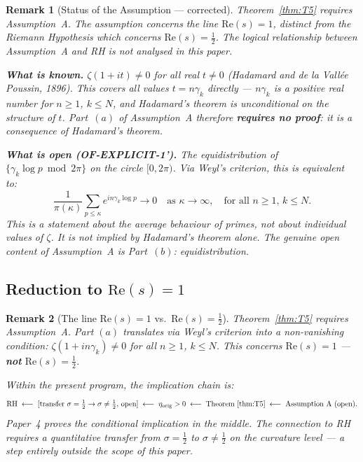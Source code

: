 \documentclass[11pt]{article}
\newtheorem*{remark}{Remark}
\newcommand{\etaorig}{\eta_{\mathrm{orig}}}
\begin{document}
\begin{remark}[Status of the Assumption --- corrected]\label{rem:assumption-status}
Theorem~\ref{thm:T5} requires Assumption~A.
The assumption concerns the line $\mathrm{Re}(s)=1$, distinct from the Riemann
Hypothesis which concerns $\mathrm{Re}(s)=\tfrac{1}{2}$.
The logical relationship between Assumption~A and RH is not analysed in this paper.

\textbf{What is known.}
$\zeta(1+it)\neq 0$ for all real $t\neq 0$
(Hadamard and de la Vall\'ee Poussin, 1896).
This covers \emph{all} values $t = n\gamma_k$ directly ---
$n\gamma_k$ is a positive real number for $n\geq 1$, $k\leq N$,
and Hadamard's theorem is unconditional on the structure of $t$.
Part~$(a)$ of Assumption~A therefore \textbf{requires no proof}: it is a
consequence of Hadamard's theorem.

\textbf{What is open (OF-EXPLICIT-1').}
The equidistribution of $\{\gamma_k\log p\bmod 2\pi\}$ on the circle $[0,2\pi)$.
Via Weyl's criterion, this is equivalent to:
\[
\frac{1}{\pi(\kappa)}\sum_{p\leq\kappa} e^{in\gamma_k\log p} \to 0
\quad\text{as }\kappa\to\infty,\quad\text{for all }n\geq 1,\,k\leq N.
\]
This is a statement about the \emph{average behaviour of primes},
not about individual values of $\zeta$.
It is not implied by Hadamard's theorem alone.
The genuine open content of Assumption~A is Part~$(b)$: equidistribution.
\end{remark}

\subsection{Reduction to $\mathrm{Re}(s) = 1$}

\begin{remark}[The line $\mathrm{Re}(s)=1$ vs.\ $\mathrm{Re}(s)=\tfrac{1}{2}$]
Theorem~\ref{thm:T5} requires Assumption~A.
Part $(a)$ translates via Weyl's criterion into a non-vanishing condition:
$\zeta(1+in\gamma_k)\neq 0$ for all $n\geq 1$, $k\leq N$.
This concerns $\mathrm{Re}(s)=1$ --- \textbf{not} $\mathrm{Re}(s)=\tfrac{1}{2}$.

Within the present program, the implication chain is:
\[
\mathrm{RH}
\;\longleftarrow\;
[\text{transfer } \sigma=\tfrac{1}{2}\to\sigma\neq\tfrac{1}{2},\,\text{open}]
\;\longleftarrow\; \etaorig > 0
\;\longleftarrow\; \text{Theorem~\ref{thm:T5}}
\;\longleftarrow\; \text{Assumption~A (open)}.
\]
Paper~4 proves the conditional implication in the middle.
The connection to RH requires a quantitative transfer from
$\sigma=\tfrac{1}{2}$ to $\sigma\neq\tfrac{1}{2}$ on the curvature level
--- a step entirely outside the scope of this paper.
\end{remark}
\end{document}
